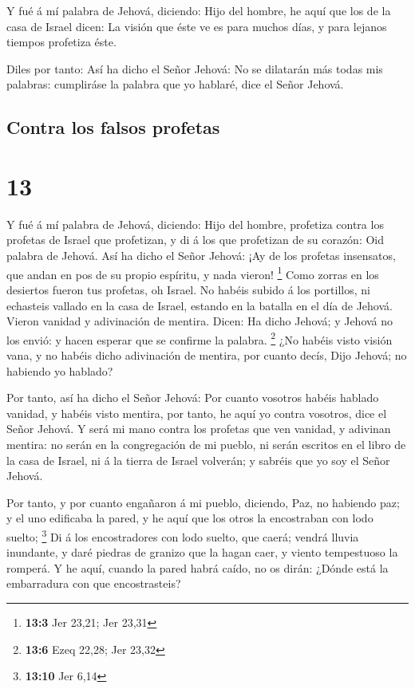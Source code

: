  Y fué á mí palabra de Jehová, diciendo:  Hijo
del hombre, he aquí que los de la casa de Israel dicen: La visión que
éste ve es para muchos días, y para lejanos tiempos profetiza éste.

 Diles por tanto: Así ha dicho el Señor Jehová: No se
dilatarán más todas mis palabras: cumpliráse la palabra que yo hablaré,
dice el Señor Jehová.

\hypertarget{contra-los-falsos-profetas}{%
\subsection{Contra los falsos
profetas}\label{contra-los-falsos-profetas}}

\hypertarget{section-12}{%
\section{13}\label{section-12}}

 Y fué á mí palabra de Jehová, diciendo:  Hijo
del hombre, profetiza contra los profetas de Israel que profetizan, y di
á los que profetizan de su corazón: Oid palabra de Jehová. 
Así ha dicho el Señor Jehová: ¡Ay de los profetas insensatos, que andan
en pos de su propio espíritu, y nada vieron! \footnote{\textbf{13:3} Jer
  23,21; Jer 23,31}  Como zorras en los desiertos fueron tus
profetas, oh Israel.  No habéis subido á los portillos, ni
echasteis vallado en la casa de Israel, estando en la batalla en el día
de Jehová.  Vieron vanidad y adivinación de mentira. Dicen:
Ha dicho Jehová; y Jehová no los envió: y hacen esperar que se confirme
la palabra. \footnote{\textbf{13:6} Ezeq 22,28; Jer 23,32} 
¿No habéis visto visión vana, y no habéis dicho adivinación de mentira,
por cuanto decís, Dijo Jehová; no habiendo yo hablado?

 Por tanto, así ha dicho el Señor Jehová: Por cuanto
vosotros habéis hablado vanidad, y habéis visto mentira, por tanto, he
aquí yo contra vosotros, dice el Señor Jehová.  Y será mi
mano contra los profetas que ven vanidad, y adivinan mentira: no serán
en la congregación de mi pueblo, ni serán escritos en el libro de la
casa de Israel, ni á la tierra de Israel volverán; y sabréis que yo soy
el Señor Jehová.

 Por tanto, y por cuanto engañaron á mi pueblo, diciendo,
Paz, no habiendo paz; y el uno edificaba la pared, y he aquí que los
otros la encostraban con lodo suelto; \footnote{\textbf{13:10} Jer 6,14}
 Di á los encostradores con lodo suelto, que caerá; vendrá
lluvia inundante, y daré piedras de granizo que la hagan caer, y viento
tempestuoso la romperá.  Y he aquí, cuando la pared habrá
caído, no os dirán: ¿Dónde está la embarradura con que encostrasteis?

